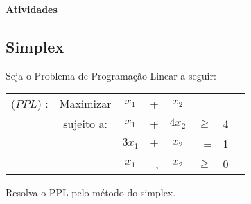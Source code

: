 \documentclass[12pt]{exam}
\begin{document}



\printanswers

\begin{center}
\textbf{{\Huge Atividades}}
\end{center}

\begin{questions}

\section*{Simplex}

\question Seja o Problema de Programação Linear a seguir:
	
	\begin{table}[H]
		\centering
			\begin{tabular}{c c c r c r c c }
			($PPL$) :&  Maximizar & $x_1$ & + & $x_2$   &  & &	\\
			& sujeito a: & $x_1$ & + & $4x_2$  & $\geq $ &	 4 \\
			 & & $3x_1$ & $+$ & $x_2$ &  = &	 1 \\
			 & & $x_1$ & , & $x_2$ &  $\geq$ &	 0
			\end{tabular}
	\end{table}	
	Resolva o PPL pelo método do simplex.
	
	\begin{solution}


\end{solution}
\end{questions}
\end{document}
